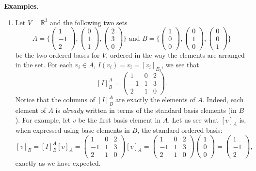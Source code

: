 \documentclass[12pt]{article}
\begin{document}
\textbf{Examples}.
\begin{enumerate}
\item Let $V=\mathbb{R}^3$ and the following two sets 
$$A=\Bigg\lbrace \begin{pmatrix} 1\\-1\\2 \end{pmatrix}, \begin{pmatrix} 0\\1\\1 \end{pmatrix}, \begin{pmatrix} 2\\3\\0 \end{pmatrix} \Bigg\rbrace \mbox{ and }B=\Bigg\lbrace \begin{pmatrix} 1\\0\\0 \end{pmatrix}, \begin{pmatrix} 0\\1\\0 \end{pmatrix}, \begin{pmatrix} 0\\0\\1 \end{pmatrix} \Bigg\rbrace$$
be the two ordered bases for $V$, ordered in the way the elements are arranged in the set.  For each $v_i\in A$, $I(v_i)=v_i=[v_i]_{E_3}$, we see that $$[I]^A_B=\begin{pmatrix} 1&0&2 \\ -1&1&3 \\ 2&1&0 \end{pmatrix}.$$  Notice that the columns of $[I]^A_B$ are exactly the elements of $A$.  Indeed, each element of $A$ is \emph{already} written in terms of the standard basis elements (in $B$).  For example, let $v$ be the first basis element in $A$.  Let us see what $[v]_A$ is, when expressed using base elements in $B$, the standard ordered basis: $$[v]_B=[I]^A_B[v]_A=\begin{pmatrix} 1&0&2 \\ -1&1&3 \\ 2&1&0 \end{pmatrix}[v]_A = \begin{pmatrix} 1&0&2 \\ -1&1&3 \\ 2&1&0 \end{pmatrix}\begin{pmatrix} 1\\0\\0 \end{pmatrix}=\begin{pmatrix} 1\\-1\\2 \end{pmatrix},$$ exactly as we have expected. 

\end{enumerate}
\end{document}
